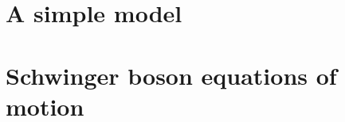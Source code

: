 \documentclass[nofootinbib,twocolumn]{revtex4-2}
\newcommand{\1}{\mathds{1}}
\begin{document}
\section{A simple model}
\label{sec:simple_model}






\onecolumngrid
\appendix

\section{Schwinger boson equations of motion}
\label{sec:bosons}
\end{document}
